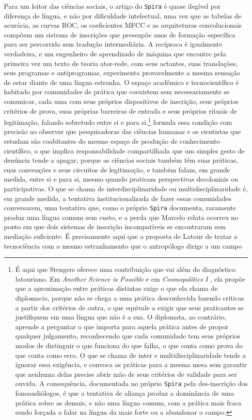 Para um leitor das ciências sociais, o artigo do \texttt{Spira} é quase ilegível por diferença de língua, e não por dificuldade intelectual, uma vez que as tabelas de acurácia, as curvas ROC, os coeficientes MFCC e as arquiteturas convolucionais compõem um sistema de inscrições que pressupõe anos de formação específica para ser percorrido sem tradução intermediária. A recíproca é igualmente verdadeira, e um engenheiro de aprendizado de máquina que encontre pela primeira vez um texto de teoria ator-rede, com seus actantes, suas translações, seus programas e antiprogramas, experimenta provavelmente a mesma sensação de estar diante de uma língua estranha. O espaço acadêmico e tecnocientífico é habitado por comunidades de prática que coexistem sem necessariamente se comunicar, cada uma com seus próprios dispositivos de inscrição, seus próprios critérios de prova, suas próprias barreiras de entrada e seus próprios rituais de legitimação, falando sobretudo entre si e para si.\footnote{É aqui que Stengers oferece uma contribuição que vai além do diagnóstico latouriano. Em \textit{Another Science is Possible} \parencite{stengers2018another} e em \textit{Cosmopolitics I} \parencite{stengers2010cosmopolitics1}, ela propõe que a aproximação entre práticas distintas exige o que ela chama de diplomacia, porque não se chega a uma prática desconhecida fazendo críticas a partir dos critérios de outra, o que equivale a exigir que seus praticantes se justifiquem em uma língua que não é a sua. O diplomata, ao contrário, aprende a perguntar o que importa para aquela prática antes de propor qualquer julgamento, reconhecendo que cada comunidade tem seus próprios modos de distinguir o que funciona do que falha, o que conta como prova do que conta como erro. O que se chama de inter e multidisciplinaridade tende a ignorar essa exigência, e convoca as práticas para a mesma mesa sem garantir que nenhuma delas precise abrir mão de seus critérios de validade para ser ouvida. A consequência, documentada no próprio \texttt{Spira} pela des-inscrição dos fonoaudiólogos, é que a tentativa de aliança produz a dominância de uma prática sobre as demais, e não uma língua comum, com a prática mais fraca sendo forçada a falar na língua da mais forte ou a abandonar o campo.} \textcite{costa2024manchando} formula essa condição com precisão ao observar que pesquisadoras das ciências humanas e os cientistas que estudam são coabitantes do mesmo espaço de produção de conhecimento científico, o que implica responsabilidade compartilhada que um simples gesto de denúncia tende a apagar, porque as ciências sociais também têm suas práticas, suas convenções e seus circuitos de legitimação, e também falam, em grande medida, entre si e para si, mesmo quando praticam perspectivas decoloniais ou participativas. O que se chama de interdisciplinaridade ou multidisciplinaridade é, em grande medida, a tentativa institucionalizada de fazer essas comunidades conversarem, uma tentativa que, como o próprio \texttt{Spira} documenta, raramente produz uma língua comum sem custo, e a perda que Marcelo relata ocorreu no ponto em que dois sistemas de inscrição incompatíveis se encontraram sem mediação suficiente. É precisamente aqui que a proposta de Latour de tratar a tecnociência com o mesmo estranhamento que o antropólogo dirige a um campo 